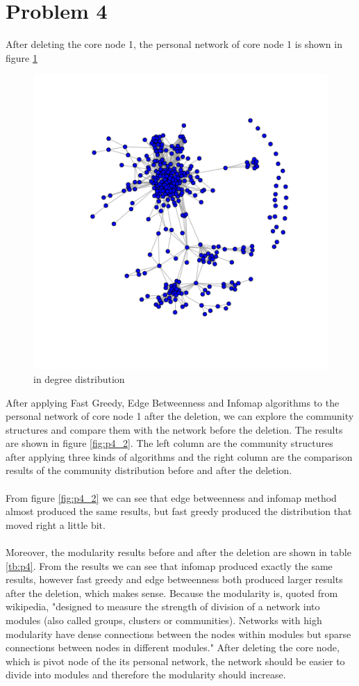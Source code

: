 \documentclass{article}
\begin{document}
\section{Problem 4}
After deleting the core node 1, the personal network of core node 1 is shown in figure \ref{fig:p4_1}
\begin{figure}[htbp]
\centering
\includegraphics[width=.8\textwidth]{p4_1.png}
\caption{in degree distribution}
\label{fig:p4_1}
\end{figure}
After applying Fast Greedy, Edge Betweenness and Infomap algorithms to the personal network of core node 1 after the deletion, we can explore the community structures and compare them with the network before the deletion. The results are shown in figure \ref{fig:p4_2}. The left column are the community structures after applying three kinds of algorithms and the right column are the comparison results of the community distribution before and after the deletion.\\
\\
 From figure \ref{fig:p4_2} we can see that edge betweenness and infomap method almost produced the same results, but fast greedy produced the distribution that moved right a little bit. \\
 \\
 Moreover, the modularity results before and after the deletion are shown in table \ref{tb:p4}. From the results we can see that infomap produced exactly the same results, however fast greedy and edge betweenness both produced larger results after the deletion, which makes sense. Because the modularity is, quoted from wikipedia, "designed to measure the strength of division of a network into modules (also called groups, clusters or communities). Networks with high modularity have dense connections between the nodes within modules but sparse connections between nodes in different modules." After deleting the core node, which is pivot node of the its personal network, the network should be easier to divide into modules and therefore the modularity should increase.
\end{document}
